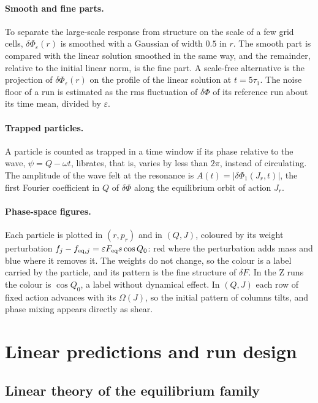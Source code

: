 \documentclass[11pt,a4paper]{article}
\begin{document}
\paragraph{Smooth and fine parts.} To separate the large-scale response from structure
on the scale of a few grid cells, $\delta\Phi_\varepsilon(r)$ is smoothed with a Gaussian
of width $0.5$ in $r$. The smooth part is compared with the linear solution smoothed in
the same way, and the remainder, relative to the initial linear norm, is the fine part.
A scale-free alternative is the projection of $\delta\Phi_\varepsilon(r)$ on the profile of
the linear solution at $t=5\tau_1$. The noise floor of a run is estimated as the rms
fluctuation of $\delta\Phi$ of its reference run about its time mean, divided by
$\varepsilon$.

\paragraph{Trapped particles.} A particle is counted as trapped in a time window if its
phase relative to the wave, $\psi=Q-\omega t$, librates, that is, varies by less than
$2\pi$, instead of circulating. The amplitude of the wave felt at the resonance is
$A(t)=|\delta\Phi_1(J_r,t)|$, the first Fourier coefficient in $Q$ of $\delta\Phi$ along
the equilibrium orbit of action $J_r$.

\paragraph{Phase-space figures.} Each particle is plotted in $(r,p_r)$ and in $(Q,J)$,
coloured by its weight perturbation $f_j-f_{{\rm eq},j}=\varepsilon F_{\rm eq}s\cos Q_0$:
red where the perturbation adds mass and blue where it removes it. The weights do not
change, so the colour is a label carried by the particle, and its pattern is the fine
structure of $\delta F$. In the Z runs the colour is $\cos Q_0$, a label without dynamical
effect. In $(Q,J)$ each row of fixed action advances with its $\Omega(J)$, so the initial
pattern of columns tilts, and phase mixing appears directly as shear.

\section{Linear predictions and run design}
\label{sec:diseno}

\subsection{Linear theory of the equilibrium family}
\label{sec:prediccion_lineal}
\end{document}
